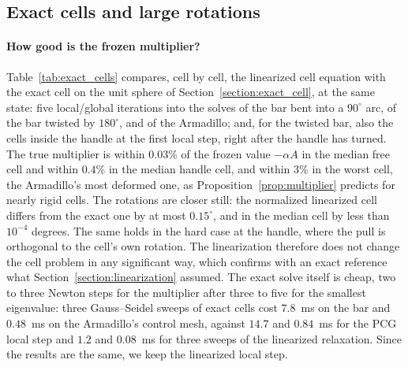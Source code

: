 \documentclass{birkjour}
\theoremstyle{remark}
\numberwithin{equation}{section}
\begin{document}
\subsection{Exact cells and large rotations}
\label{section:results_exact}

\paragraph{How good is the frozen multiplier?} Table~\ref{tab:exact_cells} compares, cell by cell, the linearized cell equation with the exact cell on the unit sphere of Section~\ref{section:exact_cell}, at the same state: five local/global iterations into the solves of the bar bent into a $90^\circ$ arc, of the bar twisted by $180^\circ$, and of the Armadillo; and, for the twisted bar, also the cells inside the handle at the first local step, right after the handle has turned. The true multiplier is within $0.03\%$ of the frozen value $-\alpha A$ in the median free cell and within $0.4\%$ in the median handle cell, and within $3\%$ in the worst cell, the Armadillo's most deformed one, as Proposition~\ref{prop:multiplier} predicts for nearly rigid cells. The rotations are closer still: the normalized linearized cell differs from the exact one by at most $0.15^\circ$, and in the median cell by less than $10^{-4}$ degrees. The same holds in the hard case at the handle, where the pull is orthogonal to the cell's own rotation. The linearization therefore does not change the cell problem in any significant way, which confirms with an exact reference what Section~\ref{section:linearization} assumed. The exact solve itself is cheap, two to three Newton steps for the multiplier after three to five for the smallest eigenvalue: three Gauss--Seidel sweeps of exact cells cost $7.8$~ms on the bar and $0.48$~ms on the Armadillo's control mesh, against $14.7$ and $0.84$~ms for the PCG local step and $1.2$ and $0.08$~ms for three sweeps of the linearized relaxation. Since the results are the same, we keep the linearized local step.
\end{document}
